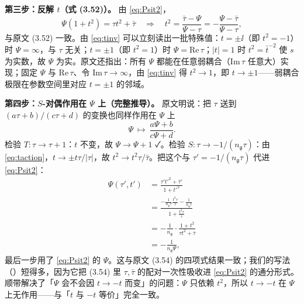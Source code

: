 \textbf{第三步：反解 $t$（式 (3.52)）。} 由 \eqref{eq:Psit2}，
\begin{equation}
\Psi(1+t^2)=\tau t^2+\bar\tau
\quad\Longrightarrow\quad
t^2=\frac{\bar\tau-\Psi}{\Psi-\tau}=-\frac{\Psi-\bar\tau}{\Psi-\tau},
\label{eq:tinv}
\end{equation}
与原文 (3.52) 一致\pA{}。由 \eqref{eq:tinv} 可以立刻读出一批特殊值：$t=\pm\ii$（即 $t^2=-1$）时 $\Psi=\infty$，与 $\tau$ 无关；$t=\pm1$（即 $t^2=1$）时 $\Psi=\mathrm{Re}\,\tau$；$|t|=1$ 时 $t^2=\bar t^{-2}$ 使 $s$ 为实数，故 $\Psi$ 为实\pA{}。原文还指出：所有 $\Psi$ 都能在任意弱耦合（$\mathrm{Im}\,\tau$ 任意大）实现；固定 $\Psi$ 与 $\mathrm{Re}\,\tau$、令 $\mathrm{Im}\,\tau\to\infty$，由 \eqref{eq:tinv} 得 $t^2\to1$，即 $t\to\pm1$——弱耦合极限在参数空间里对应 $t=\pm1$ 的邻域\pA{}。

\textbf{第四步：$S$-对偶作用在 $\Psi$ 上（完整推导）。} 原文明说：把 $\tau$ 送到 $(a\tau+b)/(c\tau+d)$ 的变换也同样作用在 $\Psi$ 上\pA{}
\begin{equation}
\Psi\ \longmapsto\ \frac{a\Psi+b}{c\Psi+d}.
\label{eq:Spsi}
\end{equation}
检验 $T:\tau\to\tau+1$：$t$ 不变，故 $\Psi\to\Psi+1$ ✓。检验 $S:\tau\to-1/(n_{\mathfrak g}\tau)$：由 \eqref{eq:taction}，$t\to\pm t\tau/|\tau|$，故 $t^2\to t^2\tau/\bar\tau$。把这个与 $\tau'=-1/(n_{\mathfrak g}\tau)$ 代进 \eqref{eq:Psit2}：
\begin{align}
\Psi(\tau',t')
&=\frac{\tau't'^2+\bar\tau'}{1+t'^2}\nonumber\\
&=\frac{-\frac{1}{n_{\mathfrak g}\tau}\frac{t^2\tau}{\bar\tau}-\frac{1}{n_{\mathfrak g}\bar\tau}}{1+\frac{t^2\tau}{\bar\tau}}\nonumber\\
&=-\frac{1}{n_{\mathfrak g}}\cdot\frac{1+t^2}{\tau t^2+\bar\tau}\nonumber\\
&=-\frac{1}{n_{\mathfrak g}\Psi},
\label{eq:Sderiv}
\end{align}
最后一步用了 \eqref{eq:Psit2} 的 $\Psi$。这与原文 (3.54) 的四项式结果一致\pA{}；我们的写法（\pB）短得多，因为它把 (3.54) 里 $\tau,\bar\tau$ 的配对一次性吸收进 \eqref{eq:Psit2} 的通分形式。顺带解决了「$\Psi$ 会不会因 $t\to-t$ 而变」的问题：$\Psi$ 只依赖 $t^2$，所以 $t\to-t$ 在 $\Psi$ 上无作用——与「$t$ 与 $-t$ 等价」完全一致\pA{}。


